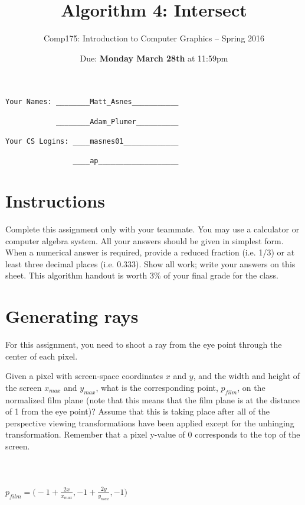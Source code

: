 \documentclass[10pt,twocolumn]{article}
\title{\Huge{\bf Algorithm 4: Intersect}}
\author{Comp175: Introduction to Computer Graphics -- Spring 2016}
\date{Due:  {\bf Monday March 28th} at 11:59pm}                                           %
\begin{document}
\maketitle

\begin{verbatim}
Your Names: ________Matt_Asnes___________

            ________Adam_Plumer__________

Your CS Logins: ____masnes01_____________

                ____ap___________________
\end{verbatim}

\section{Instructions}
Complete this assignment only with your teammate. You may use a calculator or computer algebra system. All your answers should be given in simplest form. When a numerical answer is required, provide a reduced fraction (i.e. 1/3) or at least three decimal places (i.e. 0.333). Show all work; write your answers on this sheet. This algorithm handout is worth 3\% of your final grade for the class.

\section{Generating rays}
For this assignment, you need to shoot a ray from the eye point through the center of each pixel.

\begin{framed}
\noindent {\bf [1 point]} Given a pixel with screen-space coordinates $x$ and $y$, and the width and height of the screen $x_{max}$ and $y_{max}$, what is the corresponding point, $p_{film}$, on the normalized film plane (note that this means that the film plane is at the distance of 1 from the eye point)? Assume that this is taking place after all of the perspective viewing transformations have been applied except for the unhinging transformation. Remember that a pixel y-value of 0 corresponds to the top of the screen.\\\\\\\\
$p_{film} = \Big(-1 + \frac{2 x}{x_{max}}, -1 + \frac{2 y}{y_{max}}, -1 \Big)$\\\\\\
\end{framed}
\end{document}
